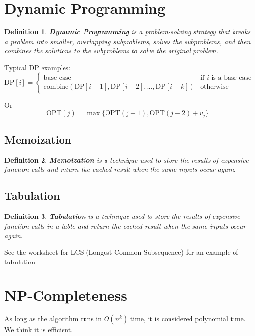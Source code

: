 \documentclass[11pt,fleqn]{article}
\newtheorem*{definition}{Definition}
\begin{document}
\section{Dynamic Programming}

\begin{definition}
    \textbf{Dynamic Programming} is a problem-solving strategy that breaks a problem into smaller, overlapping subproblems, solves the subproblems, and then combines the solutions to the subproblems to solve the original problem.
\end{definition}

Typical DP examples: \[
    \text{DP}[i] = \begin{cases}
        \text{base case} & \text{if } i \text{ is a base case} \\
        \text{combine}(\text{DP}[i-1], \text{DP}[i-2], \ldots, \text{DP}[i-k]) & \text{otherwise}
    \end{cases}
\]

Or \[
    \text{OPT}(j) = \max \{ \text{OPT}(j-1), \text{OPT}(j-2) + v_j \}
\]

\subsection{Memoization}
\begin{definition}
    \textbf{Memoization} is a technique used to store the results of expensive function calls and return the cached result when the same inputs occur again.
\end{definition}

\subsection{Tabulation}
\begin{definition}
    \textbf{Tabulation} is a technique used to store the results of expensive function calls in a table and return the cached result when the same inputs occur again.
\end{definition}

See the worksheet for LCS (Longest Common Subsequence) for an example of tabulation.

\section{NP-Completeness}
As long as the algorithm runs in $O(n^k)$ time, it is considered polynomial time. We think it is efficient.
\end{document}
